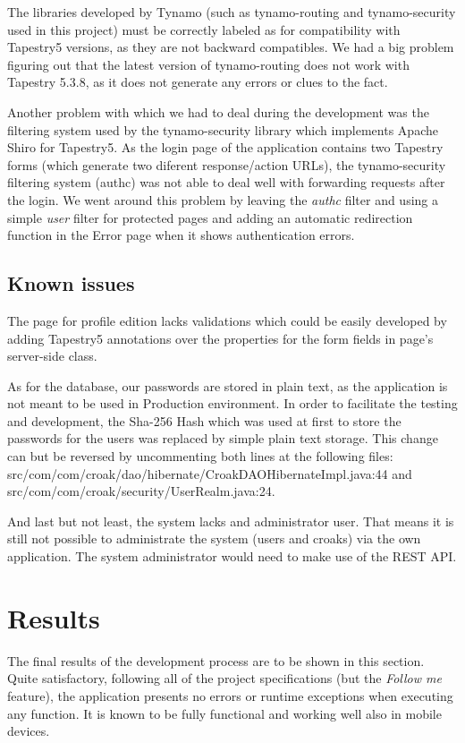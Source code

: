 \documentclass[paper=a4, fontsize=12pt]{scrartcl}
\numberwithin{equation}{section}    %
\numberwithin{figure}{section}      %
\numberwithin{table}{section}        %
\begin{document}
The libraries developed by Tynamo (such as tynamo-routing and tynamo-security used in this project)
must be correctly labeled as for compatibility with Tapestry5 versions, as they are not backward compatibles.
We had a big problem figuring out that the latest version of tynamo-routing does not work
with Tapestry 5.3.8, as it does not generate any errors or clues to the fact.

Another problem with which we had to deal during the development was the filtering system
used by the tynamo-security library which implements Apache Shiro for Tapestry5.
As the login page of the application contains two Tapestry forms (which generate two diferent
response/action URLs), the tynamo-security filtering system (authc) was not able to deal well with
forwarding requests after the login. We went around this problem by leaving the \emph{authc} filter
and using a simple \emph{user} filter for protected pages and adding an automatic redirection function
in the Error page when it shows authentication errors.

\subsection{Known issues}
The page for profile edition lacks validations which could be easily developed by adding
Tapestry5 annotations over the properties for the form fields in page's server-side class.

As for the database, our passwords are stored in plain text, as the application is not meant to be used in
Production environment. In order to facilitate the testing and development, the Sha-256 Hash which was used
at first to store the passwords for the users was replaced by simple plain text storage. This change can
but be reversed by uncommenting both lines at the following files:
src/com/com/croak/dao/hibernate/CroakDAOHibernateImpl.java:44 and
src/com/com/croak/security/UserRealm.java:24.

And last but not least, the system lacks and administrator user. That means it is
still not possible to administrate the system (users and croaks) via the own application.
The system administrator would need to make use of the REST API.


\pagebreak
\section{Results}
The final results of the development process are to be shown in this section.
Quite satisfactory, following all of the project specifications (but the \emph{Follow me} feature),
the application presents no errors or runtime exceptions when executing any function.
It is known to be fully functional and working well also in mobile devices.
\end{document}
